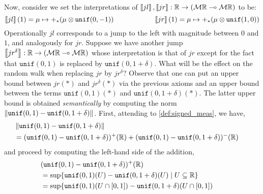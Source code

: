 \begin{example}
Now, consider we set the interpretations of $\left \llbracket jl \right \rrbracket, \left \llbracket jr \right \rrbracket: \mathbb{R} \to ( \mathcal{M}\mathbb{R} \multimap  \mathcal{M}\mathbb{R})$ to be:
\[
                        \left \llbracket jl \right \rrbracket(1)= \mu \mapsto +_\ast(\mu \otimes \mathtt{unif}(0,-1))
                        \hspace{2cm}
                        \left \llbracket jr \right \rrbracket(1) =\mu \mapsto +_\ast(\mu \otimes \mathtt{unif}(1,0))
        \]
Operationally $jl$ corresponds to a jump to the left with magnitude between $0$ and $1$, and analogously for $jr$.
Suppose we have another jump $\left \llbracket jr^{\delta} \right \rrbracket : \mathbb{R} \to ( \mathcal{M}\mathbb{R} \multimap  \mathcal{M}\mathbb{R})$ whose interpretation is that of $jr$ except for the 
fact that $\mathtt{unif}(0,1)$ is replaced by $\mathtt{unif}(0,1+\delta)$.
What will be the effect on the random walk when replacing $jr$ by $jr^{\delta}$?
Observe that one can put an upper bound between $jr(\ast)$ and $jr^{\delta}(\ast)$ via the previous axioms and an upper bound between the terms $\mathtt{unif}(0,1)(\ast)$ and $\mathtt{unif}(0,1+\delta)(\ast)$. The latter upper bound is obtained \emph{semantically} by computing the norm $\left\lVert \mathtt{unif}(0,1) - \mathtt{unif}(0,1+\delta)  \right\rVert$.  First, attending to \autoref{def:signed_meas}, we have,
        \begin{align*}
        &\hspace{-15pt} \norm{ \mathtt{unif}(0,1) - \mathtt{unif}(0,1+\delta) }
        \\
        & \hspace{-15pt} =
        (\mathtt{unif}(0,1) - \mathtt{unif}(0,1+\delta))^+ (\Reals)
        +
        (\mathtt{unif}(0,1) - \mathtt{unif}(0,1+\delta))^- (\Reals)
        \end{align*}
        and proceed by computing the left-hand side of the addition,
        \begin{align*} 
        & \hspace{-15pt}(\mathtt{unif}(0,1) - \mathtt{unif}(0,1+\delta))^+ (\Reals)
        \\
        & \hspace{-15pt} = 
        \sup \{ \mathtt{unif}(0,1)(U) - \mathtt{unif}(0,1 + \delta)(U)
        \mid U \subseteq \Reals \}
        \\
        & \hspace{-15pt}
        =
        \sup \{ \mathtt{unif}(0,1)(U \cap [0,1]) 
        - \mathtt{unif}(0,1 + \delta)(U \cap [0,1]) \\
        & \hspace{-15pt} \hspace{10pt}

\end{align*}
\end{example}

